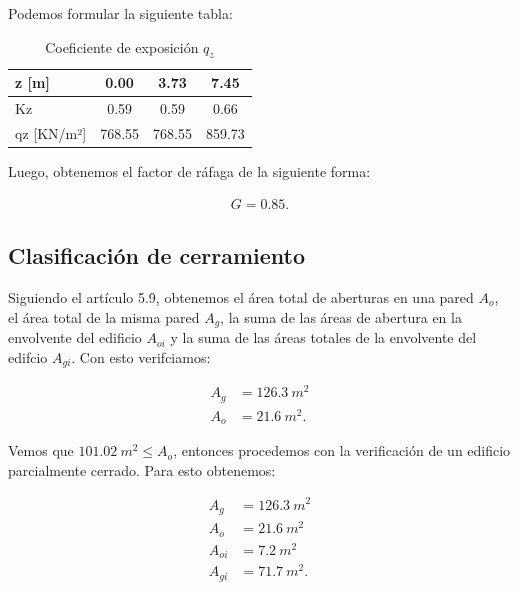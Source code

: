 \documentclass[../main.tex]{subfiles}
\begin{document}
Podemos formular la siguiente tabla:

\begin{table}[htbp]
  \centering
  \caption{Coeficiente de exposición $q_z$}
    \begin{tabular}{|l|c|c|c|}
    \hline
    \rowcolor[rgb]{ .851,  .882,  .949} z                [m] & \cellcolor[rgb]{ 1,  1,  1}0.00 & \cellcolor[rgb]{ 1,  1,  1}3.73 & \cellcolor[rgb]{ 1,  1,  1}7.45 \bigstrut\\
    \hline
    \rowcolor[rgb]{ .851,  .882,  .949} Kz    & \cellcolor[rgb]{ 1,  1,  1}0.59 & \cellcolor[rgb]{ 1,  1,  1}0.59 & \cellcolor[rgb]{ 1,  1,  1}0.66 \bigstrut\\
    \hline
    \rowcolor[rgb]{ .851,  .882,  .949} qz    [KN/m²] & \cellcolor[rgb]{ 1,  1,  1}768.55 & \cellcolor[rgb]{ 1,  1,  1}768.55 & \cellcolor[rgb]{ 1,  1,  1}859.73 \bigstrut\\
    \hline
    \end{tabular}%
\end{table}%

Luego, obtenemos el factor de ráfaga de la siguiente forma:

\begin{align*}
  G = 0.85
.\end{align*}

\subsection{Clasificación de cerramiento}

Siguiendo el artículo 5.9, obtenemos el área total de aberturas en una pared $A_o$,
el área total de la misma pared  $A_g$, la suma de las áreas de abertura en la 
envolvente del edificio $A_{oi}$ y la suma de las áreas totales de la 
envolvente del edifcio $A_{gi}$. Con esto verifciamos:

\begin{align*}
  A_g &= \SI{126.3}{m^2} \\[5pt]
  A_o &= \SI{21.6}{m^2}
.\end{align*}

Vemos que $\SI{101.02}{m^2}\leq  A_o$, entonces procedemos con la verificación de
un edificio parcialmente cerrado.
Para esto obtenemos:

\begin{align*}
  A_g &= \SI{126.3}{m^2} \\[5pt]
  A_o &= \SI{21.6}{m^2} \\[5pt]
  A_{oi} &= \SI{7.2}{m^2} \\[5pt]
  A_{gi} &= \SI{71.7}{m^2}
.\end{align*}
\end{document}
